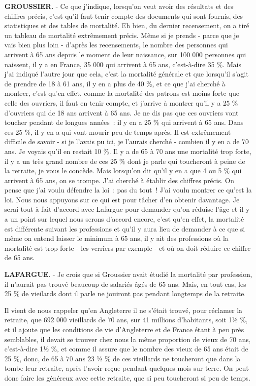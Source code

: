 \documentclass[french,twoside]{book} %
\begin{document}
\textbf{GROUSSIER}. - Ce que j’indique, lorsqu’on veut avoir des résultats et des chiffres précis, c’est qu’il faut tenir compte des documents qui sont fournis, des statistiques et des tables de mortalité. Eh bien, du dernier recensement, on a tiré un tableau de mortalité extrêmement précis. Même si je prends - parce que je vais bien plus loin - d’après les recensements, le nombre des personnes qui arrivent à 65 ans depuis le moment de leur naissance, sur 100 000 personnes qui naissent, il y a en France, 35 000 qui arrivent à 65 ans, c’est-à-dire 35 \%. Mais j’ai indiqué l’autre jour que cela, c’est la mortalité générale et que lorsqu’il s’agit de prendre de 18 à 61 ans, il y en a plus de 40 \%, et ce que j’ai cherché à montrer, c’est qu’en effet, comme la mortalité des patrons est moins forte que celle des ouvriers, il faut en tenir compte, et j’arrive à montrer qu’il y a 25 \% d’ouvriers qui de 18 ans arrivent à 65 ans. Je ne dis pas que ces ouvriers vont toucher pendant de longues années : il y en a 25 \% qui arrivent à 65 ans. Dans ces 25 \%, il y en a qui vont mourir peu de temps après. Il est extrêmement difficile de savoir - si je l’avais pu ici, je l’aurais cherché - combien il y en a de 70 ans. Je voyais qu’il en restait 10 \%. Il y a de 65 à 70 ans une mortalité trop forte, il y a un très grand nombre de ces 25 \% dont je parle qui toucheront à peine de la retraite, je vous le concède. Mais lorsqu’on dit qu’il y en a que 4 ou 5 \% qui arrivent à 65 ans, on  se trompe. J'ai cherché à établir des chiffres précis. On pense que j’ai voulu défendre la loi : pas du tout ! J'ai voulu montrer ce qu’est la loi. Nous nous appuyons sur ce qui est pour tâcher d’en obtenir davantage. Je serai tout à fait d’accord avec Lafargue pour demander qu’on réduise l’âge et il y a un point sur lequel nous serons d’accord encore, c’est qu’en effet, la mortalité est différente suivant les professions et qu’il y aura lieu de demander à ce que si même on entend laisser le minimum à 65 ans, il y ait des professions où la mortalité est trop forte - les verriers par exemple - et où on doit réduire ce chiffre de 65 ans.\par
\textbf{LAFARGUE}. - Je crois que si Groussier avait étudié la mortalité par profession, il n’aurait pas trouvé beaucoup de salariés âgés de 65 ans. Mais, en tout cas, les 25 \% de vieilards dont il parle ne jouiront pas pendant longtemps de la retraite.\par
Il vient de nous rappeler qu’en Angleterre il ne s’était trouvé, pour réclamer la retraite, que 692 000 vieillards de 70 ans, sur 41 millions d’habitants, soit 1½ \%, et il ajoute que les conditions de vie d’Angleterre et de France étant à peu près semblables, il devait se trouver chez nous la même proportion de vieux de 70 ans, c’est-à-dire 1½ \%, et comme il assure que le nombre des vieux de 65 ans était de 25 \%, donc, de 65 à 70 ans 23 ½ \% de ces vieillards ne toucheront que dans la tombe leur retraite, après l’avoir reçue pendant quelques mois sur terre. On peut donc faire les généreux avec cette retraite, que si peu toucheront si peu de temps.\par
\end{document}
